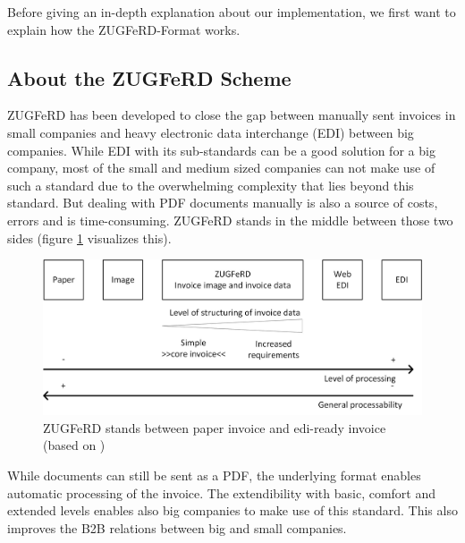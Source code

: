 Before giving an in-depth explanation about our implementation, we first want to explain how the ZUGFeRD-Format works.

\subsection{About the ZUGFeRD Scheme}
\label{sec5.7.1}

ZUGFeRD has been developed to close the gap between manually sent invoices in small companies and heavy electronic data interchange (EDI) between big companies. While EDI with its sub-standards can be a good solution for a big company, most of the small and medium sized companies can not make use of such a standard due to the overwhelming complexity that lies beyond this standard. But dealing with PDF documents manually is also a source of costs, errors and is time-consuming. ZUGFeRD stands in the middle between those two sides (figure \ref{ZugFerdImage} visualizes this).
\begin{figure}[htb!]
\centering
\includegraphics[width=\textwidth]{Images/ZugFerd/ZugFerd_English.jpg}
\caption{ZUGFeRD stands between paper invoice and edi-ready invoice (based on \cite[page 13]{zugFerdSpecificationEnglish})  \label{ZugFerdImage}}
\end{figure}

While documents can still be sent as a PDF, the underlying format enables automatic processing of the invoice. The extendibility with basic, comfort and extended levels enables also big companies to make use of this standard. This also improves the B2B relations between big and small companies.


